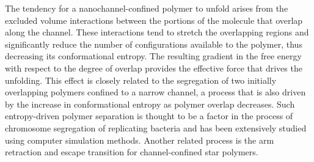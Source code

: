 \documentclass[journal=mamobx,manuscript=article,layout=twocolumn]{achemso}
\begin{document}
The tendency for a nanochannel-confined polymer to unfold arises from the excluded
volume interactions between the portions of the molecule that overlap along the channel.
These interactions tend to stretch the overlapping regions and significantly reduce 
the number of configurations available to the polymer, thus decreasing its conformational
entropy.  The resulting gradient in the free energy with respect to the degree of overlap provides 
the effective force that drives the unfolding. This effect is closely related to the 
segregation of two initially overlapping polymers confined to a narrow channel, a process 
that is also driven by the increase in conformational entropy as polymer overlap decreases.
Such entropy-driven polymer separation is thought to be a factor in the process of
chromosome segregation of replicating bacteria\cite{jun2006entropy,jun2010entropy}
and has been extensively studied using computer simulation methods.\cite{%
jun2006entropy,jun2007confined,arnold2007time,jung2010overlapping,jung2012ring,%
jung2012intrachain,liu2012segregation,dorier2013modelling,racko2013segregation,%
shin2014mixing,minina2014induction,minina2015entropic,chen2015polymer,polson2014polymer}
Another related process is the arm retraction and escape transition for
channel-confined star polymers.\cite{racko2015arm}
\end{document}
